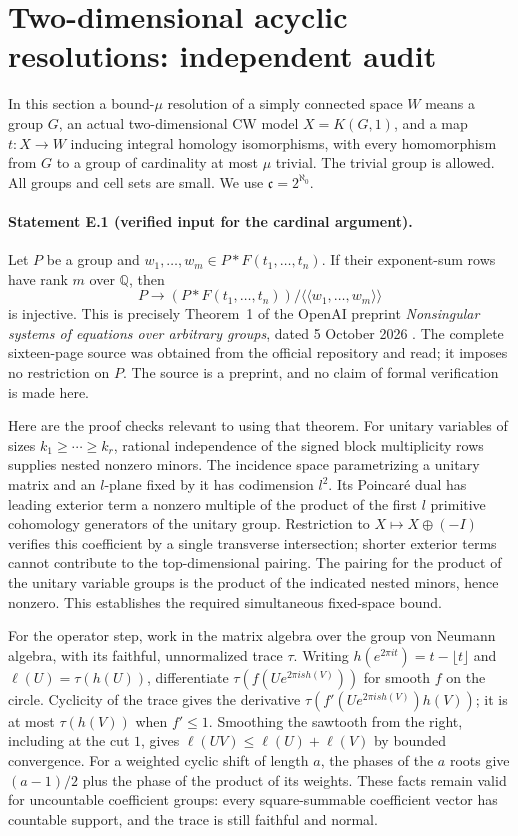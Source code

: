 \section{Two-dimensional acyclic resolutions: independent audit}
\label{sec:E-audit}

In this section a bound-$\mu$ resolution of a simply connected space $W$
means a group $G$, an actual two-dimensional CW model $X=K(G,1)$,
and a map $t:X\to W$ inducing integral homology isomorphisms, with
every homomorphism from $G$ to a group of cardinality at most $\mu$
trivial. The trivial group is allowed. All groups and cell sets are small.
We use $\mathfrak c=2^{\aleph_0}$.

\paragraph{Statement E.1 (verified input for the cardinal argument).}
Let $P$ be a group and $w_1,\ldots,w_m\in P*F(t_1,\ldots,t_n)$.
If their exponent-sum rows have rank $m$ over $\mathbb Q$, then
\[
 P\longrightarrow (P*F(t_1,\ldots,t_n))/
                   \langle\!\langle w_1,\ldots,w_m\rangle\!\rangle
\]
is injective. This is precisely Theorem~1 of the OpenAI preprint
\emph{Nonsingular systems of equations over arbitrary groups}, dated
5 October 2026 \cite[Theorem~1 and Remark~5.1]{EOpenAI2026}.
The complete sixteen-page source was obtained from the
official repository and read; it imposes no restriction on $P$.
The source is a preprint, and no claim of formal verification is made here.

Here are the proof checks relevant to using that theorem. For unitary
variables of sizes $k_1\geq\cdots\geq k_r$, rational independence of
the signed block multiplicity rows supplies nested nonzero minors.
The incidence space parametrizing a unitary matrix and an $l$-plane
fixed by it has codimension $l^2$. Its Poincar\'e dual has leading
exterior term a nonzero multiple of the product of the first $l$
primitive cohomology generators of the unitary group. Restriction to
$X\mapsto X\oplus(-I)$ verifies this coefficient by a single transverse
intersection; shorter exterior terms cannot contribute to the
top-dimensional pairing. The pairing for the product of the unitary
variable groups is the product of the indicated nested minors, hence
nonzero. This establishes the required simultaneous fixed-space bound.

For the operator step, work in the matrix algebra over the group von
Neumann algebra, with its faithful, unnormalized trace $\tau$.
Writing $h(e^{2\pi it})=t-\lfloor t\rfloor$ and
$\ell(U)=\tau(h(U))$, differentiate
$\tau(f(Ue^{2\pi is h(V)}))$ for smooth $f$ on the circle.
Cyclicity of the trace gives the derivative
$\tau(f'(Ue^{2\pi is h(V)})h(V))$; it is at most $\tau(h(V))$
when $f'\leq1$. Smoothing the sawtooth from the right, including at
the cut $1$, gives $\ell(UV)\leq\ell(U)+\ell(V)$ by bounded
convergence. For a weighted cyclic shift of length $a$, the phases of
the $a$ roots give $(a-1)/2$ plus the phase of the product of its weights.
These facts remain valid for uncountable coefficient groups: every
square-summable coefficient vector has countable support, and the trace
is still faithful and normal.

